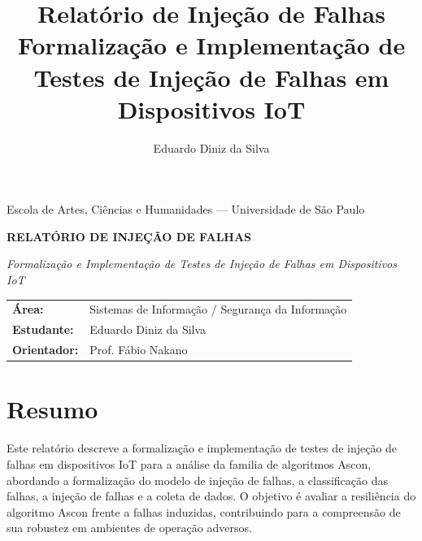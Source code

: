 \documentclass[12pt,a4paper]{article}
\title{
    \textbf{Relatório de Injeção de Falhas}\\[0.3cm]
    \large Formalização e Implementação de Testes de Injeção de Falhas em Dispositivos IoT
}
\author{Eduardo Diniz da Silva}
\date{}
\begin{document}

\begin{center}
    
    \large
    Escola de Artes, Ciências e Humanidades --- Universidade de São Paulo

    \vspace{1.5cm}

    \Large
    \textbf{RELATÓRIO DE INJEÇÃO DE FALHAS}

    \vspace{0.3cm}

    \large
    \textit{Formalização e Implementação de Testes de Injeção de Falhas em Dispositivos IoT}

    \vspace{1cm}

    \normalsize

    \begin{tabular}{ll}
        \textbf{Área:} & Sistemas de Informação / Segurança da Informação \\
        \textbf{Estudante:} & Eduardo Diniz da Silva \\
        \textbf{Orientador:} & Prof. Fábio Nakano
    \end{tabular}

\end{center}


\section{Resumo}

Este relatório descreve a formalização e implementação de testes de injeção de falhas em dispositivos IoT para a análise da familia de algoritmos Ascon, abordando a formalização do modelo de injeção de falhas, a classificação das falhas, a injeção de falhas e a coleta de dados. O objetivo é avaliar a resiliência do algoritmo Ascon frente a falhas induzidas, contribuindo para a compreensão de sua robustez em ambientes de operação adversos.


\end{document}
